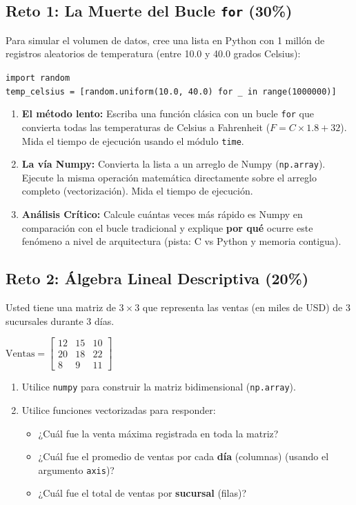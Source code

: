 \documentclass[12pt,a4paper]{article}
\begin{document}
\subsection*{Reto 1: La Muerte del Bucle \texttt{for} (30\%)}
Para simular el volumen de datos, cree una lista en Python con 1 millón de registros aleatorios de temperatura (entre 10.0 y 40.0 grados Celsius):
\begin{center}
    \texttt{import random}\\
    \texttt{temp\_celsius = [random.uniform(10.0, 40.0) for \_ in range(1000000)]}
\end{center}
\begin{enumerate}
    \item \textbf{El método lento:} Escriba una función clásica con un bucle \texttt{for} que convierta todas las temperaturas de Celsius a Fahrenheit ($F = C \times 1.8 + 32$). Mida el tiempo de ejecución usando el módulo \texttt{time}.
    \item \textbf{La vía Numpy:} Convierta la lista a un arreglo de Numpy (\texttt{np.array}). Ejecute la misma operación matemática directamente sobre el arreglo completo (vectorización). Mida el tiempo de ejecución.
    \item \textbf{Análisis Crítico:} Calcule cuántas veces más rápido es Numpy en comparación con el bucle tradicional y explique \textbf{por qué} ocurre este fenómeno a nivel de arquitectura (pista: C vs Python y memoria contigua).
\end{enumerate}

\subsection*{Reto 2: Álgebra Lineal Descriptiva (20\%)}
Usted tiene una matriz de $3 \times 3$ que representa las ventas (en miles de USD) de 3 sucursales durante 3 días.
\begin{center}
    $ \text{Ventas} = \begin{bmatrix}
    12 & 15 & 10 \\
    20 & 18 & 22 \\
    8 & 9 & 11
    \end{bmatrix} $
\end{center}
\begin{enumerate}
    \item Utilice \texttt{numpy} para construir la matriz bidimensional (\texttt{np.array}).
    \item Utilice funciones vectorizadas para responder:
    \begin{itemize}
        \item ¿Cuál fue la venta máxima registrada en toda la matriz?
        \item ¿Cuál fue el promedio de ventas por cada \textbf{día} (columnas) (usando el argumento \texttt{axis})?
        \item ¿Cuál fue el total de ventas por \textbf{sucursal} (filas)?
    \end{itemize}
\end{enumerate}
\end{document}
